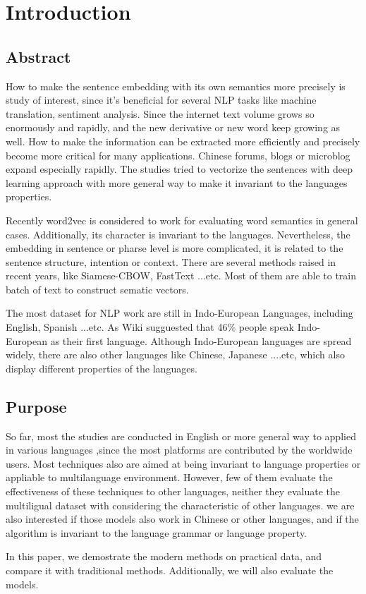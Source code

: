 \chapter{Introduction}
\setlength{\baselineskip}{1.5em}
\setlength{\parindent}{2em}
\setlength{\parskip}{1em}

\section{Abstract}

How to make the sentence embedding with its own semantics more precisely is study of interest, since it's beneficial for several NLP tasks like machine translation, sentiment analysis. 
Since the internet text volume grows so enormously and rapidly, and the new derivative or new word keep growing as well.
How to make the information can be extracted more efficiently and precisely become more critical for many applications.  
Chinese forums, blogs or microblog expand especially rapidly. The studies tried to vectorize the sentences with deep learning approach with more general way to make it invariant to the languages properties.  


Recently word2vec\cite{word2vec} is considered to work for evaluating word semantics in general cases.  
Additionally, its character is invariant to the languages. Nevertheless, 
the embedding in sentence or pharse level is more complicated, it is related to the sentence structure,  
intention or context. There are several methods raised in recent years, like Siamese-CBOW, FastText ...etc. 
Most of them are able to train batch of text to construct sematic vectors.

The most dataset for NLP work are still in Indo-European Languages, including English, Spanish ...etc. As Wiki sugguested that 46\% people speak Indo-European as their first language. 
Although Indo-European languages are spread widely, there are also other languages like Chinese, Japanese ....etc, which also display different properties of the languages.

\section{Purpose}

So far, most the studies are conducted in English or more general way to applied in various languages
,since the most platforms are contributed by the worldwide users. Most techniques also are aimed at being invariant to language properties or appliable to multilanguage environment. 
However, few of them evaluate the effectiveness of these techniques to other languages, neither they evaluate the multiligual dataset with considering the characteristic of other languages.   
we are also interested if those models also work in Chinese or other languages, and if the algorithm is invariant to the language grammar or language property. 

In this paper, we demostrate the modern methods on practical data, and compare it with traditional methods. Additionally, we will also evaluate the models.